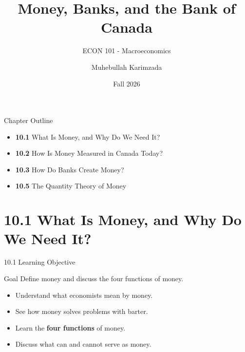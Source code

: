 \documentclass[aspectratio=169]{beamer}
\title{\textbf{Money, Banks, and the Bank of Canada \vspace{.5cm}\\  }}
\subtitle{ {\large ECON 101 - Macroeconomics}}
\author{Muhebullah Karimzada}
\date{Fall 2026}
\begin{document}
\begin{frame}[plain]
  \titlepage
\end{frame}

\begin{frame}{Chapter Outline}
\transfade
\begin{itemize}[<+->]
  \item \textbf{10.1} What Is Money, and Why Do We Need It?
  \item \textbf{10.2} How Is Money Measured in Canada Today?
  \item \textbf{10.3} How Do Banks Create Money?
  \item \textbf{10.5} The Quantity Theory of Money
\end{itemize}
\end{frame}

\section{10.1 What Is Money, and Why Do We Need It?}

\begin{frame}{10.1 Learning Objective}
\transfade
\begin{block}{Goal}
Define money and discuss the four functions of money.
\end{block}
\begin{itemize}[<+->]
  \item Understand what economists mean by \alert{money}.
  \item See how money solves problems with barter.
  \item Learn the \textbf{four functions} of money.
  \item Discuss what can and cannot serve as money.
\end{itemize}
\end{frame}
\end{document}
